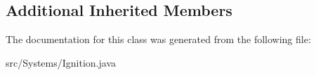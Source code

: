 \subsection*{Additional Inherited Members}


The documentation for this class was generated from the following file\+:\begin{DoxyCompactItemize}
\item 
src/\+Systems/Ignition.\+java\end{DoxyCompactItemize}
